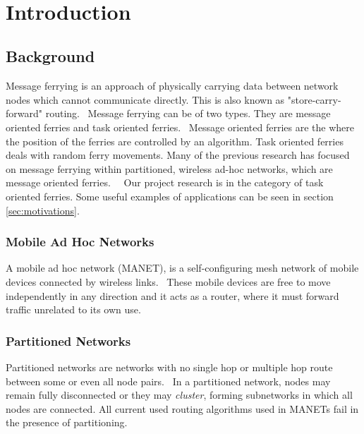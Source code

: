 ~\cite{adhocmsgferry}
~\cite{hybrid}
~\cite{Routing}
~\cite{wearable}
~\cite{QoSrouting}
~\cite{efficientrouting}
~\cite{implement}
~\cite{book1}

\chapter{Introduction} 

\section{Background}
Message ferrying is an approach of physically carrying data between network nodes which cannot communicate directly.
This is also known as "store-carry-forward" routing.~\cite{Routing}
Message ferrying can be of two types.  
They are message oriented ferries and task oriented ferries.~\cite{hybrid}
Message oriented ferries are the where the position of the ferries are controlled by an algorithm.  Task oriented ferries deals with random ferry movements.
Many of the previous research has focused on message ferrying within partitioned, wireless ad-hoc networks, which are message oriented ferries.~\cite{Routing}~\cite{adhocmsgferry}	
Our project research is in the category of task oriented ferries.
Some useful examples of applications can be seen in section \ref{sec:motivations}.


\subsection{Mobile Ad Hoc Networks}
A mobile ad hoc network (MANET),  is a self-configuring mesh network of mobile devices connected by wireless links.~\cite{book1}
These mobile devices are free to move independently in any direction and it acts as a router, where it must forward traffic unrelated to its own use.

\subsection{Partitioned Networks}
Partitioned networks are networks with no single hop or multiple hop route between some or even all node pairs.~\cite{hybrid}
In a partitioned network, nodes may remain fully disconnected or they may \emph{cluster}, forming subnetworks in which all nodes are connected.
All current used routing algorithms used in MANETs %
fail in the presence of partitioning.~\cite{Routing}

